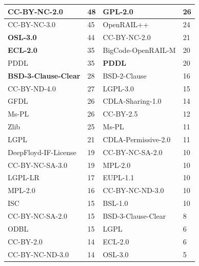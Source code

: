 \begin{table}[h]
\begin{tabular}{|ll||ll|}
  \multicolumn{1}{|l|}{CC-BY-NC-2.0} & 48 & \multicolumn{1}{l|}{GPL-2.0} & 26 \\ \hline
  \multicolumn{1}{|l|}{CC-BY-NC-3.0} & 45 & \multicolumn{1}{l|}{OpenRAIL++} & 24 \\ \hline
  \multicolumn{1}{|l|}{\textbf{OSL-3.0}} & 44 & \multicolumn{1}{l|}{CC-BY-NC-2.0} & 21 \\ \hline
  \multicolumn{1}{|l|}{\textbf{ECL-2.0}} & 35 & \multicolumn{1}{l|}{BigCode-OpenRAIL-M} & 20 \\ \hline
  \multicolumn{1}{|l|}{PDDL} & 35 & \multicolumn{1}{l|}{\textbf{PDDL}} & 20 \\ \hline
  \multicolumn{1}{|l|}{\textbf{BSD-3-Clause-Clear}} & 28 & \multicolumn{1}{l|}{BSD-2-Clause} & 16 \\ \hline
  \multicolumn{1}{|l|}{CC-BY-ND-4.0} & 27 & \multicolumn{1}{l|}{LGPL-3.0} & 15 \\ \hline
  \multicolumn{1}{|l|}{GFDL} & 26 & \multicolumn{1}{l|}{CDLA-Sharing-1.0} & 14 \\ \hline
  \multicolumn{1}{|l|}{Ms-PL} & 26 & \multicolumn{1}{l|}{CC-BY-2.5} & 12 \\ \hline
  \multicolumn{1}{|l|}{Zlib} & 25 & \multicolumn{1}{l|}{Ms-PL} & 11 \\ \hline
  \multicolumn{1}{|l|}{LGPL} & 21 & \multicolumn{1}{l|}{CDLA-Permissive-2.0} & 11 \\ \hline
  \multicolumn{1}{|l|}{DeepFloyd-IF-License} & 19 & \multicolumn{1}{l|}{CC-BY-NC-SA-2.0} & 10 \\ \hline
  \multicolumn{1}{|l|}{CC-BY-NC-SA-3.0} & 19 & \multicolumn{1}{l|}{MPL-2.0} & 10 \\ \hline
  \multicolumn{1}{|l|}{LGPL-LR} & 17 & \multicolumn{1}{l|}{EUPL-1.1} & 10 \\ \hline
  \multicolumn{1}{|l|}{MPL-2.0} & 16 & \multicolumn{1}{l|}{CC-BY-NC-ND-3.0} & 10 \\ \hline
  \multicolumn{1}{|l|}{ISC} & 15 & \multicolumn{1}{l|}{BSL-1.0} & 10 \\ \hline
  \multicolumn{1}{|l|}{CC-BY-NC-SA-2.0} & 15 & \multicolumn{1}{l|}{BSD-3-Clause-Clear} & 8 \\ \hline
  \multicolumn{1}{|l|}{ODBL} & 15 & \multicolumn{1}{l|}{LGPL} & 6 \\ \hline
  \multicolumn{1}{|l|}{CC-BY-2.0} & 14 & \multicolumn{1}{l|}{ECL-2.0} & 6 \\ \hline
  \multicolumn{1}{|l|}{CC-BY-NC-ND-3.0} & 14 & \multicolumn{1}{l|}{OSL-3.0} & 5 \\ \hline

\end{tabular}
\end{table}
